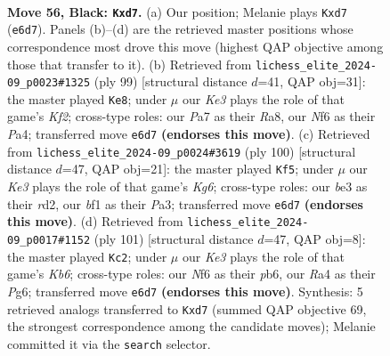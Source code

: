 \documentclass[11pt]{article}
\begin{document}
\clearpage

\begin{figure}[p]\centering
\begin{subfigure}{0.46\textwidth}\centering
\resizebox{\linewidth}{!}{%
\newchessgame
\chessboard[
  setfen={8/p1pR4/4knR1/5p2/r4P2/4B3/2K4P/5B2 b - - 0 56},
  showmover=false,
  pgfstyle=straightmove, color=movearrow, markmove={e6-d7}
]}
\caption{}
\end{subfigure}\hfill
\begin{subfigure}{0.46\textwidth}\centering
\resizebox{\linewidth}{!}{%
\newchessgame
\chessboard[
  setfen={r7/4pk2/5p2/5P2/p2B2P1/RnP5/4K3/8 b - - 3 50},
  showmover=false,
  pgfstyle=straightmove, color=movearrow, markmove={f7-e8}
]}
\caption{}
\end{subfigure}
\\[4pt]
\begin{subfigure}{0.46\textwidth}\centering
\resizebox{\linewidth}{!}{%
\newchessgame
\chessboard[
  setfen={8/4p3/2k3K1/R2p2N1/p7/P5r1/1P1r4/8 w - - 0 51},
  showmover=false,
  pgfstyle=straightmove, color=movearrow, markmove={g6-f5}
]}
\caption{}
\end{subfigure}\hfill
\begin{subfigure}{0.46\textwidth}\centering
\resizebox{\linewidth}{!}{%
\newchessgame
\chessboard[
  setfen={8/1r6/1P1K2p1/4B3/1R5p/1kP4P/p3r3/8 b - - 9 51},
  showmover=false,
  pgfstyle=straightmove, color=movearrow, markmove={b3-c2}
]}
\caption{}
\end{subfigure}
\caption{\textbf{Move 56, Black: \texttt{Kxd7}.} (a) Our position; Melanie plays \texttt{Kxd7} (\texttt{e6d7}). Panels (b)--(d) are the retrieved master positions whose correspondence most drove this move (highest QAP objective among those that transfer to it). (b) Retrieved from \texttt{lichess\_elite\_2024-09\_p0023\#1325} (ply 99) [structural distance $d$=41, QAP obj=31]: the master played \texttt{Ke8}; under $\mu$ our \emph{Ke3} plays the role of that game's \emph{Kf2}; cross-type roles: our \emph{P}a7 as their \emph{R}a8, our \emph{N}f6 as their \emph{P}a4; transferred move \texttt{e6d7} \textbf{(endorses this move)}. (c) Retrieved from \texttt{lichess\_elite\_2024-09\_p0024\#3619} (ply 100) [structural distance $d$=47, QAP obj=21]: the master played \texttt{Kf5}; under $\mu$ our \emph{Ke3} plays the role of that game's \emph{Kg6}; cross-type roles: our \emph{b}e3 as their \emph{r}d2, our \emph{b}f1 as their \emph{P}a3; transferred move \texttt{e6d7} \textbf{(endorses this move)}. (d) Retrieved from \texttt{lichess\_elite\_2024-09\_p0017\#1152} (ply 101) [structural distance $d$=47, QAP obj=8]: the master played \texttt{Kc2}; under $\mu$ our \emph{Ke3} plays the role of that game's \emph{Kb6}; cross-type roles: our \emph{N}f6 as their \emph{p}b6, our \emph{R}a4 as their \emph{P}g6; transferred move \texttt{e6d7} \textbf{(endorses this move)}. Synthesis: 5 retrieved analogs transferred to \texttt{Kxd7} (summed QAP objective 69, the strongest correspondence among the candidate moves); Melanie committed it via the \texttt{search} selector.}
\label{fig:thought-m111}
\end{figure}
\end{document}
